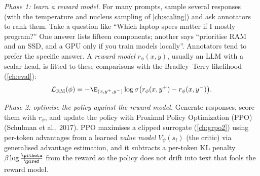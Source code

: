 \emph{Phase 1: learn a reward model.} For many prompts, sample several responses (with the
temperature and nucleus sampling of \cref{ch:scaling}) and ask annotators to rank them.
Take a question like ``Which laptop specs matter if I mostly program?'' One answer lists
fifteen components; another says ``prioritise RAM and an SSD, and a GPU only if you train
models locally''. Annotators tend to prefer the specific answer. A \emph{reward model}
$r_\phi(x,y)$, usually an LLM with a scalar head, is fitted to these comparisons with the
Bradley--Terry likelihood (\cref{ch:eval}):
\begin{equation}
\mathcal{L}_{\text{RM}}(\phi)=-\E_{(x,y^+,y^-)}\log\sigma\big(r_\phi(x,y^+)-r_\phi(x,y^-)\big).
\end{equation}

\emph{Phase 2: optimise the policy against the reward model.} Generate responses, score
them with $r_\phi$, and update the policy with Proximal Policy Optimization (PPO)
(Schulman et al., 2017). PPO maximises a clipped surrogate (\cref{ch:grpo2})
using per-token advantages from a learned \emph{value model} $V_\psi(s_t)$ (the critic)
via generalised advantage estimation, and it subtracts a per-token KL penalty
$\beta\log\frac{\pitheta}{\piref}$ from the reward so the policy does not drift into text
that fools the reward model.

